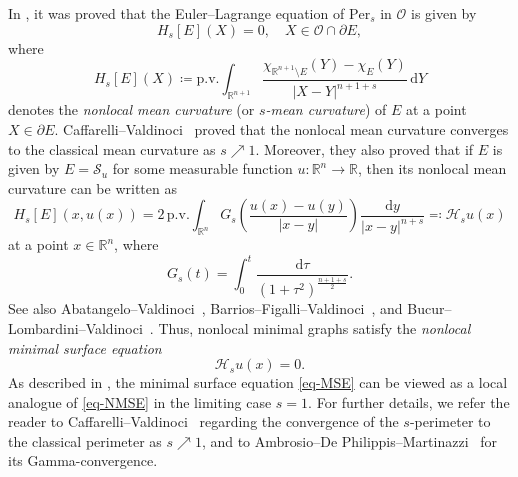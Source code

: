 \documentclass{amsart}
\theoremstyle{plain}
\theoremstyle{definition}
\numberwithin{equation}{section}
\begin{document}
In \cite{CRS10}, it was proved that the Euler--Lagrange equation of $\mathrm{Per}_s$ in $\mathcal{O}$ is given by
\begin{equation*}
H_s[E](X)=0, \quad X \in \mathcal{O}\cap \partial E,
\end{equation*}
where
\begin{equation*}
H_s[E](X) \coloneqq \mathrm{p.v.} \int_{\mathbb{R}^{n+1}} \frac{\chi_{\mathbb{R}^{n+1} \setminus E}(Y) - \chi_E(Y)}{|X-Y|^{n+1+s}} \,\mathrm{d}Y
\end{equation*}
denotes the \emph{nonlocal mean curvature} (or \emph{$s$-mean curvature}) of $E$ at a point $X \in \partial E$. Caffarelli--Valdinoci~\cite{CV13} proved that the nonlocal mean curvature converges to the classical mean curvature as $s \nearrow 1$. Moreover, they also proved that if $E$ is given by $E=\mathcal{S}_u$ for some measurable function $u: \mathbb{R}^n \to \mathbb{R}$, then its nonlocal mean curvature can be written as
\begin{equation*}
H_s[E](x, u(x)) = 2\,\mathrm{p.v.} \int_{\mathbb{R}^n} G_s\left( \frac{u(x)-u(y)}{|x-y|} \right) \frac{\mathrm{d}y}{|x-y|^{n+s}} \eqqcolon \mathscr{H}_su(x)
\end{equation*}
at a point $x \in \mathbb{R}^n$, where
\begin{equation*}
G_s(t) = \int_0^t \frac{\mathrm{d}\tau}{(1+\tau^2)^{\frac{n+1+s}{2}}}.
\end{equation*}
See also Abatangelo--Valdinoci~\cite{AV14}, Barrios--Figalli--Valdinoci~\cite[Section~3]{BFV14}, and Bucur--Lombardini--Valdinoci~\cite[Appendix~B.1]{BLV19}. Thus, nonlocal minimal graphs satisfy the \emph{nonlocal minimal surface equation}
\begin{equation}\label{eq-NMSE}
\mathscr{H}_su(x) = 0.
\end{equation}
As described in \cite{CV13}, the minimal surface equation \eqref{eq-MSE} can be viewed as a local analogue of \eqref{eq-NMSE} in the limiting case $s=1$. For further details, we refer the reader to Caffarelli--Valdinoci~\cite{CV11} regarding the convergence of the $s$-perimeter to the classical perimeter as $s \nearrow 1$, and to Ambrosio--De Philippis--Martinazzi~\cite{ADPM11} for its Gamma-convergence.
\end{document}
